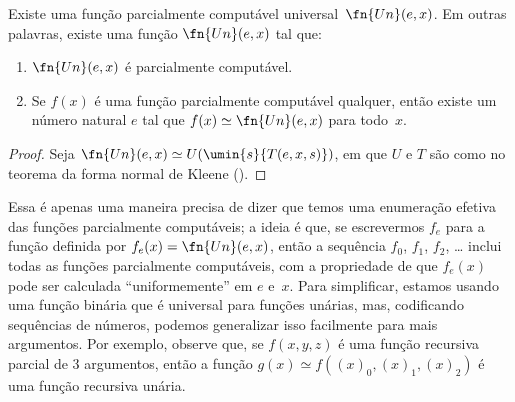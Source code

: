 \documentclass[../../../include/open-logic-section]{subfiles}
\begin{document}

\begin{thm}
Existe uma função parcialmente computável universal~$\fn{Un}(e,x)$. Em
outras palavras, existe uma função $\fn{Un}(e,x)$ tal que:
\begin{enumerate}
\item $\fn{Un}(e,x)$ é parcialmente computável.
\item Se $f(x)$ é uma função parcialmente computável qualquer, então
existe um número natural $e$ tal que
$f(x) \simeq \fn{Un}(e,x)$ para todo~$x$.
\end{enumerate}
\end{thm}

\begin{proof}
Seja $\fn{Un}(e,x) \simeq U(\umin{s}{T(e,x,s)})$, em que $U$ e $T$ são
como no teorema da forma normal de Kleene
().
\end{proof}

\begin{explain}
Essa é apenas uma maneira precisa de dizer que temos uma enumeração
efetiva das funções parcialmente computáveis; a ideia é que, se
escrevermos $f_e$ para a função definida por
$f_e(x) = \fn{Un}(e,x)$, então a sequência $f_0$, $f_1$, $f_2$, \dots
inclui todas as funções parcialmente computáveis, com a propriedade de
que $f_e(x)$ pode ser calculada ``uniformemente'' em $e$ e~$x$. Para
simplificar, estamos usando uma função binária que é universal para
funções unárias, mas, codificando sequências de números, podemos
generalizar isso facilmente para mais argumentos. Por exemplo, observe
que, se $f(x,y,z)$ é uma função recursiva parcial de $3$ argumentos,
então a função $g(x) \simeq f((x)_0, (x)_1, (x)_2)$ é uma função
recursiva unária.
\end{explain}
\end{document}
